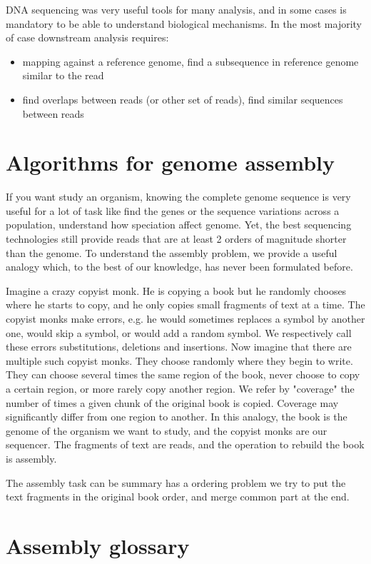 \documentclass[./main.tex]{subfiles}
\begin{document}
DNA sequencing was very useful tools for many analysis, and in some cases is mandatory to be able to understand biological mechanisms. 
In the most majority of case downstream analysis requires:
\begin{itemize}
    \item mapping against a reference genome, find a subsequence in reference genome similar to the read
    \item find overlaps between reads (or other set of reads), find similar sequences between reads 
\end{itemize}

\section{Algorithms for genome assembly}

If you want study an organism, knowing the complete genome sequence is very useful for a lot of task like find the genes or the sequence variations across a population, understand how speciation affect genome. Yet, the best sequencing technologies still provide reads that are at least 2 orders of magnitude shorter than the genome. To understand the assembly problem, we provide a useful analogy which, to the best of our knowledge, has never been formulated before.

Imagine a crazy copyist monk. He is copying a book but he randomly chooses where he starts to copy, and he only copies small fragments of text at a time.
The copyist monks make errors, e.g. he would sometimes replaces a symbol by another one, would skip a symbol, or would add a random symbol. We respectively call these errors substitutions, deletions and insertions.
Now imagine that there are multiple such copyist monks.
They choose randomly where they begin to write. They can choose several times the same region of the book, never choose to copy a certain region, or more rarely copy another region. We refer by "coverage" the number of times a given chunk of the original book is copied. Coverage may significantly differ from one region to another.
In this analogy, the book is the genome of the organism we want to study, and the copyist monks are our sequencer. The fragments of text are reads, and the operation to rebuild the book is assembly.

The assembly task can be summary has a ordering problem we try to put the text fragments in the original book order, and merge common part at the end.

\section{Assembly glossary} 
\end{document}

